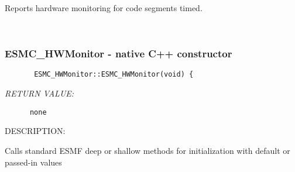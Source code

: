         Reports hardware monitoring for code segments timed.
   
 
\mbox{}\hrulefill\ 
 
\subsubsection{ESMC\_HWMonitor - native C++ constructor}


  
\begin{verbatim}       ESMC_HWMonitor::ESMC_HWMonitor(void) {\end{verbatim}{\em RETURN VALUE:}
\begin{verbatim}      none\end{verbatim}
{\sf DESCRIPTION:\\ }


        Calls standard ESMF deep or shallow methods for initialization
        with default or passed-in values
  

